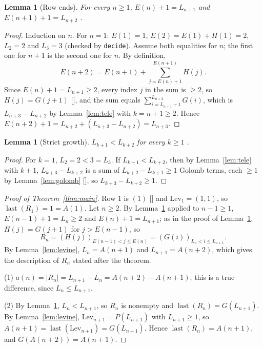 \documentclass[11pt]{amsart}
\theoremstyle{plain}
\newtheorem{lemma}[theorem]{Lemma}
\theoremstyle{definition}
\newcommand{\Lev}{\mathrm{Lev}}
\newcommand{\last}{\operatorname{last}}
\newcommand{\len}[1]{\lvert #1\rvert}
\begin{document}
\begin{lemma}[Row ends]\label{lem:rowend}
For every $n\ge1$, $E(n)+1=L_{n+1}$ and $E(n+1)+1=L_{n+2}$ {}.
\end{lemma}

\begin{proof}
Induction on $n$. For $n=1$: $E(1)=1$, $E(2)=E(1)+H(1)=2$, $L_2=2$ and $L_3=3$ (checked by \texttt{decide}). Assume both equalities for $n$; the first one for $n+1$ is the second one for $n$. By definition,
\[
  E(n+2)=E(n+1)+\sum_{j=E(n)+1}^{E(n+1)}H(j).
\]
Since $E(n)+1=L_{n+1}\ge2$, every index $j$ in the sum is $\ge2$, so $H(j)=G(j+1)$ [], and the sum equals $\sum_{i=L_{n+1}+1}^{L_{n+2}}G(i)$, which is $L_{n+3}-L_{n+2}$ by Lemma~\ref{lem:tele} with $k=n+1\ge2$. Hence $E(n+2)+1=L_{n+2}+(L_{n+3}-L_{n+2})=L_{n+3}$.
\end{proof}

\begin{lemma}[Strict growth]\label{lem:strict}
$L_{k+1}<L_{k+2}$ for every $k\ge1$ {}.
\end{lemma}

\begin{proof}
For $k=1$, $L_2=2<3=L_3$. If $L_{k+1}<L_{k+2}$, then by Lemma~\ref{lem:tele} with $k+1$, $L_{k+3}-L_{k+2}$ is a sum of $L_{k+2}-L_{k+1}\ge1$ Golomb terms, each $\ge1$ by Lemma~\ref{lem:golomb} [], so $L_{k+3}-L_{k+2}\ge1$.
\end{proof}

\begin{proof}[Proof of Theorem~\ref{thm:main}]
Row $1$ is $(1)$ [] and $\Lev_1=(1,1)$, so $\last(R_1)=1=A(1)$.
Let $n\ge2$. By Lemma~\ref{lem:rowend} applied to $n-1\ge1$, $E(n-1)+1=L_n\ge2$ and $E(n)+1=L_{n+1}$; as in the proof of Lemma~\ref{lem:rowend}, $H(j)=G(j+1)$ for $j>E(n-1)$, so
\[
  R_n=(H(j))_{E(n-1)<j\le E(n)}=(G(i))_{L_n<i\le L_{n+1}}.
\]
By Lemma~\ref{lem:levine}, $L_n=A(n+1)$ and $L_{n+1}=A(n+2)$, which gives the description of $R_n$ stated after the theorem.

(1) $a(n)=\len{R_n}=L_{n+1}-L_n=A(n+2)-A(n+1)$; this is a true difference, since $L_n\le L_{n+1}$.

(2) By Lemma~\ref{lem:strict}, $L_n<L_{n+1}$, so $R_n$ is nonempty and $\last(R_n)=G(L_{n+1})$. By Lemma~\ref{lem:levine}, $\Lev_{n+1}=P(L_{n+1})$ with $L_{n+1}\ge1$, so $A(n+1)=\last(\Lev_{n+1})=G(L_{n+1})$. Hence $\last(R_n)=A(n+1)$, and $G(A(n+2))=A(n+1)$.
\end{proof}
\end{document}
